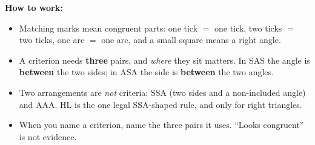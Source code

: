 \documentclass[12pt]{article}
\begin{document}

\noindent\small\textbf{How to work:}
\begin{itemize}[leftmargin=1cm, itemsep=1pt, topsep=2pt]
  \item Matching marks mean congruent parts: one tick $=$ one tick, two ticks $=$ two
        ticks, one arc $=$ one arc, and a small square means a right angle.
  \item A criterion needs \textbf{three} pairs, and \emph{where} they sit matters.
        In SAS the angle is \textbf{between} the two sides; in ASA the side is
        \textbf{between} the two angles.
  \item Two arrangements are \emph{not} criteria: SSA (two sides and a
        non-included angle) and AAA. HL is the one legal SSA-shaped rule, and only
        for right triangles.
  \item When you name a criterion, name the three pairs it uses. ``Looks congruent''
        is not evidence.
\end{itemize}
\normalsize

\end{document}
